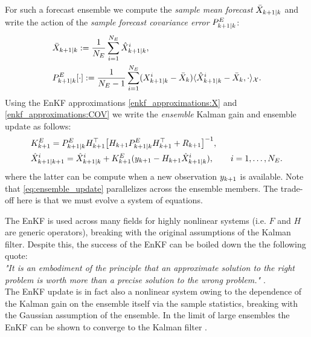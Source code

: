 For such a forecast ensemble we compute the \emph{sample mean forecast} $\bar{X}_{k+1|k}$ and write the action of the \emph{sample forecast covariance error} $P^E_{k+1|k}$:
\begin{align}
& \bar{X}_{k+1|k} := \frac{1}{N_E}\sum_{i=1}^{N_E} \hat{X}_{k+1|k}^i,\label{enkf_approximations:X}\\
& P^E_{k+1|k}[\cdot] := \frac{1}{N_E-1}\sum_{i=1}^{N_E} (X_{k+1|k}^i-\bar{X}_k)\langle \hat{X}_{k+1|k}^i-\bar{X}_k,\cdot\rangle_\mathcal{X}\label{enkf_approximations:COV}.
\end{align}
Using the EnKF approximations \eqref{enkf_approximations:X} and \eqref{enkf_approximations:COV}
we write the \emph{ensemble} Kalman gain and ensemble update as follows:
\begin{subequations}\label{eq:naive_enkf_update}
\begin{align}
& K_{k+1}^E = P^E_{k+1|k} H_{k+1}^\top\big[ H_{k+1}P^E_{k+1|k} H_{k+1}^\top + R_{k+1}\big]^{-1},\label{eq:kalman_update}\\
& \hat{X}_{k+1|k+1}^i = \hat{X}_{k+1|k}^i + K_{k+1}^E (y_{k+1} - H_{k+1} \hat{X}_{k+1|k}^i),\qquad i=1,\ldots,N_E.\label{eq:ensemble_update}
\end{align}
\end{subequations}
where the latter can be compute when a new observation $y_{k+1}$ is available. Note that 
\eqref{eq:ensemble_update} parallelizes across the ensemble members. The trade-off here is that we
must evolve a system of equations.\\

\begin{remark}[Nonlinearity]
The EnKF is used across many fields for highly nonlinear systems (i.e. $F$ and $H$ are generic operators),
breaking with the original assumptions of the Kalman filter. Despite this, the success of the EnKF can be boiled down the the following quote:\\

\textit{"It is an embodiment of the principle that an approximate solution to the right
problem is worth more than a precise solution to the wrong
problem."} \cite{katzfuss2016understanding}.\\

The EnKF update is in fact also a nonlinear system owing to the dependence of the Kalman gain on the ensemble itself via the sample statistics, breaking with the Gaussian assumption of the ensemble. In the limit of large ensembles the EnKF can be shown to converge to the Kalman filter \cite{le2009large,mandel2011convergence}.
\end{remark}


